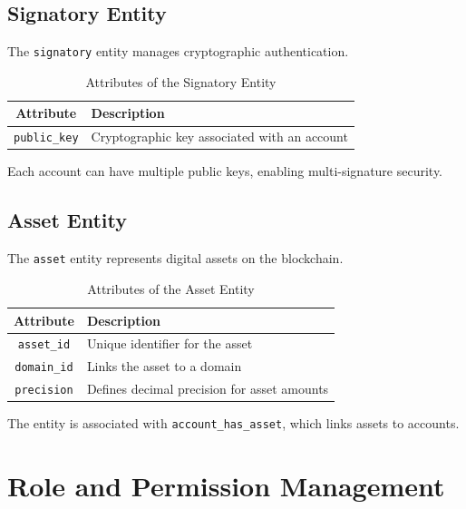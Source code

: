 \documentclass{article}
\begin{document}
\subsection{Signatory Entity}
The \texttt{signatory} entity manages cryptographic authentication.

\begin{table}[h]
      \centering
      \caption{Attributes of the Signatory Entity}
      \label{tab:signatory_attributes}
      \begin{tabular}{|c|l|}
            \hline
            \textbf{Attribute}   & \textbf{Description}                         \\ \hline
            \texttt{public\_key} & Cryptographic key associated with an account \\ \hline
      \end{tabular}
\end{table}

Each account can have multiple public keys, enabling multi-signature security.

\subsection{Asset Entity}
The \texttt{asset} entity represents digital assets on the blockchain.

\begin{table}[h]
      \centering
      \caption{Attributes of the Asset Entity}
      \label{tab:asset_attributes}
      \begin{tabular}{|c|l|}
            \hline
            \textbf{Attribute}  & \textbf{Description}                        \\ \hline
            \texttt{asset\_id}  & Unique identifier for the asset             \\ \hline
            \texttt{domain\_id} & Links the asset to a domain                 \\ \hline
            \texttt{precision}  & Defines decimal precision for asset amounts \\ \hline
      \end{tabular}
\end{table}

The entity is associated with \texttt{account\_has\_asset}, which links assets to accounts.

\section{Role and Permission Management}
\end{document}
